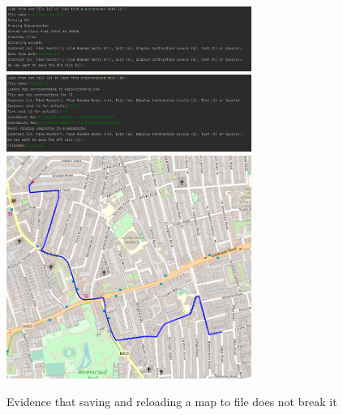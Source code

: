 \documentclass[11pt,twoside,a4paper]{report}
\begin{document}
\begin{figure}[h]
    \begin{center}
        \includegraphics[width=8cm]{savemapone.png}\\
        \includegraphics[width=8cm]{savemaptwo.png}\\
        \includegraphics[width=8cm]{savemapthree.png}
    \end{center}
    \caption{Evidence that saving and reloading a map to file does not break it}
    \label{savemapevidence}
\end{figure}
\end{document}
